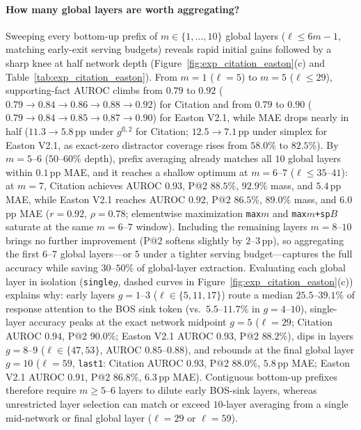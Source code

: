 \paragraph{How many global layers are worth aggregating?}
Sweeping every bottom-up prefix of $m \in \{1, \dots, 10\}$ global layers ($\ell \le 6m - 1$, matching early-exit serving budgets) reveals rapid initial gains followed by a sharp knee at half network depth (Figure~\ref{fig:exp_citation_easton}(c) and Table~\ref{tab:exp_citation_easton}). From $m = 1$ ($\ell = 5$) to $m = 5$ ($\ell \le 29$), supporting-fact AUROC climbs from $0.79$ to $0.92$ ($0.79 \to 0.84 \to 0.86 \to 0.88 \to 0.92$) for Citation and from $0.79$ to $0.90$ ($0.79 \to 0.84 \to 0.85 \to 0.87 \to 0.90$) for Easton V2.1, while MAE drops nearly in half ($11.3 \to 5.8$\,pp under $g^{\text{fl},2}$ for Citation; $12.5 \to 7.1$\,pp under simplex for Easton V2.1, as exact-zero distractor coverage rises from $58.0\%$ to $82.5\%$). By $m = 5$--$6$ ($50$--$60\%$ depth), prefix averaging already matches all $10$ global layers within $0.1$\,pp MAE, and it reaches a shallow optimum at $m = 6$--$7$ ($\ell \le 35$--$41$): at $m = 7$, Citation achieves AUROC $0.93$, P@2 $88.5\%$, $92.9\%$ mass, and $5.4$\,pp MAE, while Easton V2.1 reaches AUROC $0.92$, P@2 $86.5\%$, $89.0\%$ mass, and $6.0$\,pp MAE ($r = 0.92$, $\rho = 0.78$; elementwise maximization \texttt{max}$m$ and \texttt{max}$m$\texttt{+sp}$B$ saturate at the same $m = 6$--$7$ window). Including the remaining layers $m = 8$--$10$ brings no further improvement (P@2 softens slightly by $2$--$3$\,pp), so aggregating the first $6$--$7$ global layers---or $5$ under a tighter serving budget---captures the full accuracy while saving $30$--$50\%$ of global-layer extraction. Evaluating each global layer in isolation (\texttt{single}$g$, dashed curves in Figure~\ref{fig:exp_citation_easton}(c)) explains why: early layers $g = 1$--$3$ ($\ell \in \{5, 11, 17\}$) route a median $25.5$--$39.1\%$ of response attention to the BOS sink token (vs.\ $5.5$--$11.7\%$ in $g = 4$--$10$), single-layer accuracy peaks at the exact network midpoint $g = 5$ ($\ell = 29$; Citation AUROC $0.94$, P@2 $90.0\%$; Easton V2.1 AUROC $0.93$, P@2 $88.2\%$), dips in layers $g = 8$--$9$ ($\ell \in \{47, 53\}$, AUROC $0.85$--$0.88$), and rebounds at the final global layer $g = 10$ ($\ell = 59$, \texttt{last1}: Citation AUROC $0.93$, P@2 $88.0\%$, $5.8$\,pp MAE; Easton V2.1 AUROC $0.91$, P@2 $86.8\%$, $6.3$\,pp MAE). Contiguous bottom-up prefixes therefore require $m \ge 5$--$6$ layers to dilute early BOS-sink layers, whereas unrestricted layer selection can match or exceed $10$-layer averaging from a single mid-network or final global layer ($\ell = 29$ or $\ell = 59$).

